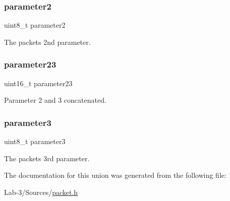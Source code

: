 \subsubsection{\texorpdfstring{parameter2}{parameter2}}
{\footnotesize\ttfamily uint8\+\_\+t parameter2}

The packet\textquotesingle{}s 2nd parameter. \mbox{\label{union_t_packet_ac3413e5ef4be0640b15c86eb9852b3e2}} 
\subsubsection{\texorpdfstring{parameter23}{parameter23}}
{\footnotesize\ttfamily uint16\+\_\+t parameter23}

Parameter 2 and 3 concatenated. \mbox{\label{union_t_packet_a4636d4af3617a80946877b5fe4b1e6fe}} 
\subsubsection{\texorpdfstring{parameter3}{parameter3}}
{\footnotesize\ttfamily uint8\+\_\+t parameter3}

The packet\textquotesingle{}s 3rd parameter. 

The documentation for this union was generated from the following file\+:\begin{DoxyCompactItemize}
\item 
Lab-\/3/\+Sources/\hyperlink{packet_8h}{packet.\+h}\end{DoxyCompactItemize}

